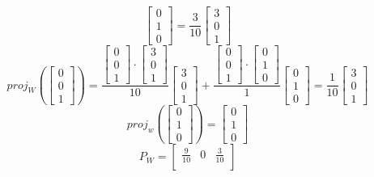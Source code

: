 \begin{enumerate}
\[\begin{bmatrix}
0 \\ 1 \\ 0 \end{bmatrix} = \frac{3}{10} \begin{bmatrix} 3 \\ 0 \\ 1 
\end{bmatrix}
\]
\[
  proj_W(\begin{bmatrix} 0 \\ 0 \\ 1 \end{bmatrix}) = 
  \frac{\begin{bmatrix} 0 \\ 0 \\ 1 \end{bmatrix} \cdot 
  \begin{bmatrix} 3 \\ 0 \\ 1 \end{bmatrix}}{10} \begin{bmatrix} 3 \\ 0 \\ 1 \end{bmatrix} 
+ \frac{\begin{bmatrix} 0 \\ 0 \\ 1 \end{bmatrix} \cdot \begin{bmatrix}
0 \\ 1 \\ 0 \end{bmatrix}}{1} \begin{bmatrix}
0 \\ 1 \\ 0 \end{bmatrix} = \frac{1}{10} \begin{bmatrix} 3 \\ 0 \\ 1 
\end{bmatrix}
\]
\[
  proj_w(\begin{bmatrix} 0 \\ 1 \\ 0 \end{bmatrix}) = 
  \begin{bmatrix} 0 \\ 1 \\ 0 \end{bmatrix}
\]
\[
  P_W = \begin{bmatrix} \frac{9}{10} & 0 & \frac{3}{10} \\

\end{bmatrix}\]
\end{enumerate}
